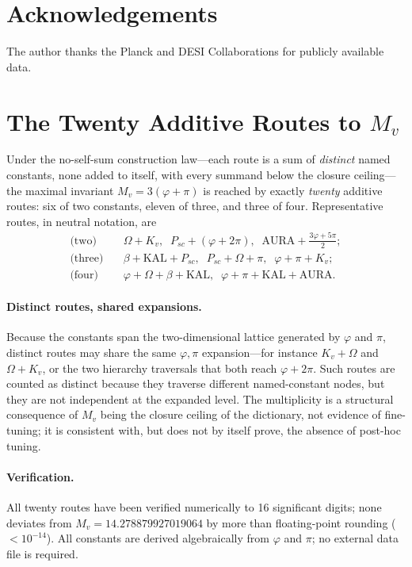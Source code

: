 \documentclass[12pt,a4paper]{article}
\begin{document}
\section*{Acknowledgements}
The author thanks the Planck and DESI Collaborations for publicly available data.

\appendix
\section{The Twenty Additive Routes to \texorpdfstring{$M_v$}{M_v}}
\label{app:independence}

Under the no-self-sum construction law---each route is a sum of \emph{distinct}
named constants, none added to itself, with every summand below the closure
ceiling---the maximal invariant $M_v=3(\varphi+\pi)$ is reached by
exactly \emph{twenty} additive routes: six of two constants, eleven of three,
and three of four. Representative routes, in neutral notation, are
\begin{align}
\text{(two)}\quad   & \Omega+K_v,\;\; P_{sc}+(\varphi+2\pi),\;\; \mathrm{AURA}+\tfrac{3\varphi+5\pi}{2}; \nonumber\\
\text{(three)}\quad & \beta+\mathrm{KAL}+P_{sc},\;\; P_{sc}+\Omega+\pi,\;\; \varphi+\pi+K_v; \nonumber\\
\text{(four)}\quad  & \varphi+\Omega+\beta+\mathrm{KAL},\;\; \varphi+\pi+\mathrm{KAL}+\mathrm{AURA}. \nonumber
\end{align}

\paragraph{Distinct routes, shared expansions.}
Because the constants span the two-dimensional lattice generated by $\varphi$
and $\pi$, distinct routes may share the same $\varphi,\pi$ expansion---for
instance $K_v+\Omega$ and $\Omega+K_v$, or the two hierarchy traversals that
both reach $\varphi+2\pi$. Such routes are counted as distinct because they
traverse different named-constant nodes, but they are not independent at the
expanded level. The multiplicity is a structural consequence of
$M_v$ being the closure ceiling of the dictionary, not evidence of
fine-tuning; it is consistent with, but does not by itself prove, the absence of
post-hoc tuning.

\paragraph{Verification.}
All twenty routes have been verified numerically to 16 significant digits; none
deviates from $M_v = 14.278879927019064$ by more than floating-point
rounding ($<10^{-14}$). All constants are derived algebraically from $\varphi$
and $\pi$; no external data file is required.
\end{document}
